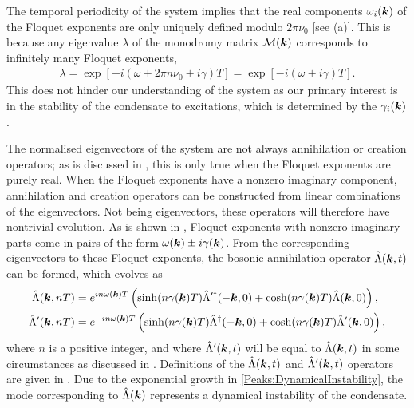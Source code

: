 The temporal periodicity of the system implies that the real components $\omega_i(\bm{k})$ of the Floquet exponents are only uniquely defined modulo $2\pi \nu_0$ [see (a)]. This is because any eigenvalue $\lambda$ of the monodromy matrix $\mathcal{M}(\bm{k})$ corresponds to infinitely many Floquet exponents,
\begin{align}
    \label{Peaks:AmbiguityFloquetExponent}
    \lambda = \exp\left[-i \left(\omega + 2 \pi n \nu_0 + i \gamma\right)T\right] = \exp\left[-i\left(\omega + i \gamma\right)T\right].
\end{align}
This does not hinder our understanding of the system as our primary interest is in the stability of the condensate to excitations, which is determined by the $\gamma_i(\bm{k})$.

The normalised eigenvectors of the system are not always annihilation or creation operators; as is discussed in , this is only true when the Floquet exponents are purely real. When the Floquet exponents have a nonzero imaginary component, annihilation and creation operators can be constructed from linear combinations of the eigenvectors. Not being eigenvectors, these operators will therefore have nontrivial evolution. As is shown in , Floquet exponents with nonzero imaginary parts come in pairs of the form $\omega(\bm{k}) \pm i \gamma(\bm{k})$. From the corresponding eigenvectors to these Floquet exponents, the bosonic annihilation operator $\hat{\Lambda}(\bm{k}, t)$ can be formed, which evolves as
\begin{subequations}
    \label{Peaks:DynamicalInstability}
    \begin{align}
        \hat{\Lambda}(\vect{k}, nT) &= e^{i n\omega(\vect{k}) T} \left( \sinh(n\gamma(\vect{k}) T) \hat{\Lambda}'^\dagger(-\vect{k}, 0) + \cosh(n\gamma(\vect{k}) T) \hat{\Lambda}(\vect{k}, 0)\right),\\
        \hat{\Lambda}'(\vect{k}, nT) &= e^{-i n \omega(\vect{k}) T} \left( \sinh(n\gamma(\vect{k}) T) \hat{\Lambda}^\dagger(-\vect{k}, 0) + \cosh(n\gamma(\vect{k}) T) \hat{\Lambda}'(\vect{k}, 0)\right),
    \end{align}
\end{subequations}
where $n$ is a positive integer, and where $\hat{\Lambda}'(\bm{k}, t)$ will be equal to $\hat{\Lambda}(\bm{k}, t)$ in some circumstances as discussed in .  Definitions of the $\hat{\Lambda}(\bm{k}, t)$ and $\hat{\Lambda}'(\bm{k}, t)$ operators are given in .  Due to the exponential growth in \eqref{Peaks:DynamicalInstability}, the mode corresponding to $\hat{\Lambda}(\bm{k})$ represents a dynamical instability of the condensate.

